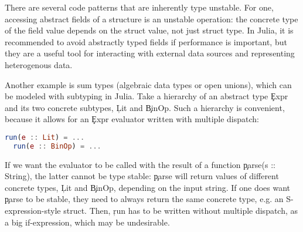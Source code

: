 There are several code patterns
that are inherently type unstable. For one, accessing abstract fields of
a structure is an unstable operation:
the concrete type of the field value depends on the struct value,
not just struct type. In Julia, it is recommended to avoid abstractly typed
fields if performance is important, %
but they are a useful tool for interacting with external data sources
and representing heterogenous data.

Another example is sum types (algebraic data types or open unions), which can be
modeled with subtyping in Julia. Take a hierarchy of an abstract type \c{Expr}
and its two concrete subtypes, \c{Lit} and \c{BinOp}.
Such a hierarchy is convenient, because
it allows for an \c{Expr} evaluator written with multiple dispatch:
\begin{lstlisting}[language=julia]
  run(e :: Lit) = ...
  run(e :: BinOp) = ...
\end{lstlisting}
If we want the evaluator to be called with the result of a function
\c{parse(s :: String)}, the latter cannot be type stable: \c{parse} will return
values of different concrete types, \c{Lit} and \c{BinOp}, depending on the
input string.
If one does want \c{parse} to be stable, they need to always
return the same concrete type, e.g. an S-expression-style struct. Then, \c{run}
has to be written without multiple dispatch, as a big if-expression, which may
be undesirable.
